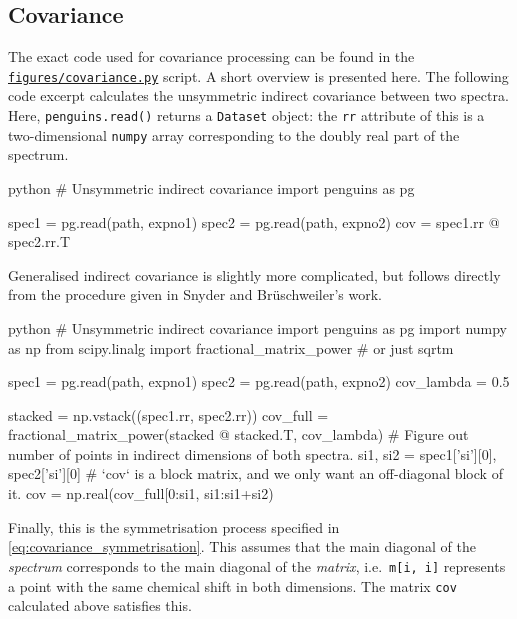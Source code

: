 \documentclass[a4paper,12pt]{article}
\begin{document}
\begin{refsection}
\subsection{Covariance}

The exact code used for covariance processing can be found in the \href{https://github.com/yongrenjie/abbs-paper/blob/main/figures/covariance.py}{\texttt{figures/covariance.py}} script.
A short overview is presented here.
The following code excerpt calculates the unsymmetric indirect covariance between two spectra.
Here, \texttt{penguins.read()} returns a \texttt{Dataset} object: the \texttt{rr} attribute of this is a two-dimensional \texttt{numpy} array corresponding to the doubly real part of the spectrum.

{\singlespacing
\begin{tcbminted}{python}
# Unsymmetric indirect covariance
import penguins as pg

spec1 = pg.read(path, expno1)
spec2 = pg.read(path, expno2)
cov = spec1.rr @ spec2.rr.T
\end{tcbminted}
}
\vspace{0.3cm}

Generalised indirect covariance is slightly more complicated, but follows directly from the procedure given in Snyder and Br\"uschweiler's work\autocite{Snyder2009JPCA}.

{\singlespacing
\begin{tcbminted}{python}
# Unsymmetric indirect covariance
import penguins as pg
import numpy as np
from scipy.linalg import fractional_matrix_power   # or just sqrtm

spec1 = pg.read(path, expno1)
spec2 = pg.read(path, expno2)
cov_lambda = 0.5

stacked = np.vstack((spec1.rr, spec2.rr))
cov_full = fractional_matrix_power(stacked @ stacked.T, cov_lambda)
# Figure out number of points in indirect dimensions of both spectra.
si1, si2 = spec1['si'][0], spec2['si'][0]
# `cov` is a block matrix, and we only want an off-diagonal block of it.
cov = np.real(cov_full[0:si1, si1:si1+si2)
\end{tcbminted}
}
\vspace{0.3cm}

Finally, this is the symmetrisation process specified in \cref{eq:covariance_symmetrisation}.
This assumes that the main diagonal of the \textit{spectrum} corresponds to the main diagonal of the \textit{matrix}, i.e.\ \texttt{m[i, i]} represents a point with the same chemical shift in both dimensions.
The matrix \texttt{cov} calculated above satisfies this.


\end{refsection}
\end{document}
